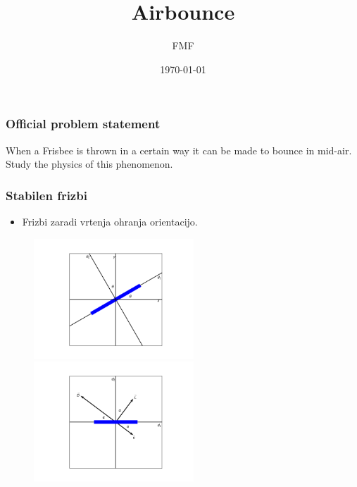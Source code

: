 \documentclass{beamer}
\title[02-airbounce]{Airbounce} %
\author{FMF} %
\institute[IPT] %
{
 \\ %
\medskip
\textit{} %
}
\date{\today} %
\begin{document}
\begin{frame}
\titlepage %
\end{frame}





\begin{frame}
\frametitle{Official problem
statement}
When a Frisbee is thrown in a certain way it can be made to bounce in mid-air. Study the physics of this phenomenon.

\end{frame}


\begin{frame}
\frametitle{Stabilen frizbi}
\begin{itemize}
\item Frizbi zaradi vrtenja ohranja orientacijo.
\end{itemize}

\begin{figure}[H]
	\centering
	\begin{minipage}{.5\textwidth}
	  \centering
	  \includegraphics[width=6cm]{graf_osi.png}
	\end{minipage}%
	\begin{minipage}{.5\textwidth}
	  \centering
	  \includegraphics[width=6cm]{osi_frisbeeja.png}
	\end{minipage}
\end{figure}

\end{frame}
\end{document}
